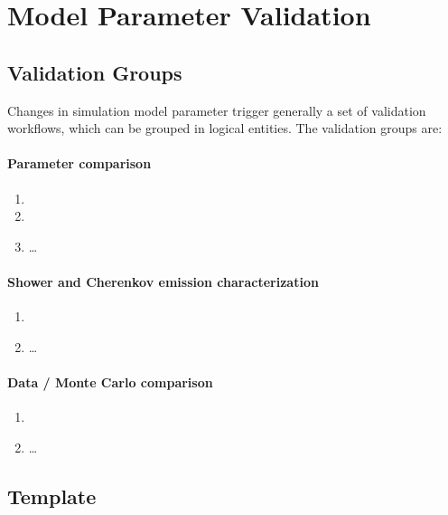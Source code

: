 \section{Model Parameter Validation}

\subsection{Validation Groups}

Changes in simulation model parameter trigger generally a set of validation workflows, which can be grouped in logical entities. The validation groups are:

\paragraph{Parameter comparison} \label{validationGroup:ModelParameterComparison}
    \begin{enumerate}
        \item {}
        \item {}
        \item \dots
    \end{enumerate}
    
\paragraph{Shower and Cherenkov emission characterization} \label{validationGroup:ReferenceModelComparison}
    \begin{enumerate}
        \item {}
        \item \dots
    \end{enumerate}
    
\paragraph{Data / Monte Carlo comparison} \label{validationGroup:DataMonteCarloComparison}
    \begin{enumerate}
        \item {}
        \item \dots
    \end{enumerate}

\subsection{Template}


